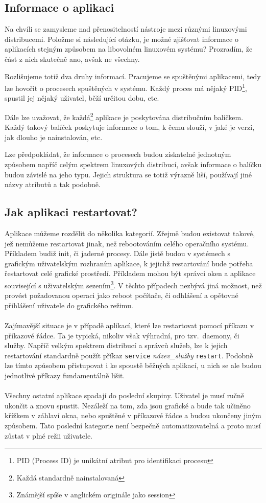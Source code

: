 \documentclass[10pt,a4paper]{article}
\begin{document}
		\subsection{Informace o aplikaci}
		Na chvíli se zamysleme nad přenositelností nástroje mezi různými linuxovými distribucemi. Položme si následující otázku, je možné zjišťovat informace o aplikacích stejným způsobem na libovolném linuxovém systému? Prozradím, že část z nich skutečně ano, avšak ne všechny.

		Rozlišujeme totiž dva druhy informací. Pracujeme se spuštěnými aplikacemi, tedy lze hovořit o procesech spuštěných v systému. Každý proces má nějaký PID\footnote{PID (Process ID) je unikátní atribut pro identifikaci procesu}, spustil jej nějaký uživatel, běží určitou dobu, etc.

		Dále lze uvažovat, že každá\footnote{Každá standardně nainstalovaná} aplikace je poskytována distribučním balíčkem. Každý takový balíček poskytuje informace o tom, k čemu slouží, v jaké je verzi, jak dlouho je nainstalován, etc.

		Lze předpokládat, že informace o procesech budou získatelné jednotným způsobem napříč celým spektrem linuxových distribucí, avšak informace o balíčku budou závislé na jeho typu. Jejich struktura se totiž výrazně liší, používají jiné názvy atributů a tak podobně.

		\subsection{Jak aplikaci restartovat?}
		Aplikace můžeme rozdělit do několika kategorií. Zřejmě budou existovat takové, jež nemůžeme restartovat jinak, než rebootováním celého operačního systému. Příkladem budiž init, či jaderné procesy. Dále jistě budou v systémech s grafickým uživatelským rozhraním aplikace, k jejichž restartování bude potřeba řestartovat celé grafické prostředí. Příkladem mohou být správci oken a aplikace související s uživatelským sezením\footnote{Známější spíše v anglickém originále jako session}. V těchto případech nezbývá jiná možnost, než provést požadovanou operaci jako reboot počítače, či odhlášení a opětovné přihlášení uživatele do grafického režimu.
		\\
		\\
		Zajímavější situace je v případě aplikací, které lze restartovat pomocí příkazu v příkazové řádce. Ta je typická, nikoliv však výhradní, pro tzv.\ daemony, či služby. Napříč velkým spektrem distribucí a správců služeb, lze k jejich restartování standardně použít příkaz \texttt{service} \textit{název\_služby} \texttt{restart}. Podobně lze tímto způsobem přistupovat i ke spoustě běžných aplikací, u nich se ale budou jednotlivé příkazy fundamentálně lišit.
		\\
		\\
		Všechny ostatní aplikace spadají do poslední skupiny. Uživatel je musí ručně ukončit a znovu spustit. Nezáleží na tom, zda jsou grafické a bude tak učiněno křížkem v záhlaví okna, nebo spuštěné v příkazové řádce a budou ukončeny jiným způsobem. Tato poslední kategorie není bezpečně automatizovatelná a proto musí zůstat v plné režii uživatele.
\end{document}
